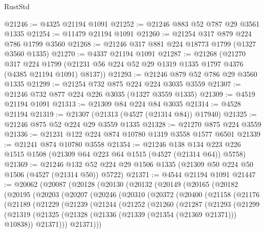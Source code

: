 \begin{lexlean}{RustStd}
\begin{coremodule}
@21246 := @4325 @21194 @1091
@21252 := @21246 @883 @52 @787 @29 @3561 @1335
@21254 := @11479 @21194 @1091
@21260 := @21254 @317 @879 @224 @786 @1799 @3560
@21268 := @21246 @317 @881 @224 @18773 @1799 (@1327 @3560 @1335)
@21270 := @4337 @21194 @1091
@21287 := @21268
    (@21270
      @317
      @224
      @1799
      (@21231 @56 @224 @52 @29 @1319 @1335 @1797 @4376 (@4385 @21194 @1091) @8137))
@21293 := @21246 @879 @52 @786 @29 @3560 @1335
@21299 := @21254 @732 @875 @224 @224 @3035 @3559
@21307 := @21246 @732 @877 @224 @226 @3035 (@1327 @3559 @1335)
@21309 := @4519 @21194 @1091
@21313 := @21309 @84 @224 @84 @3035
@21314 := @4528 @21194
@21319 := @21307 (@21313 (@4527 (@21314 @84)) @17940)
@21325 := @21246 @875 @52 @224 @29 @3559 @1335
@21328 := @21270 @875 @224 @3559
@21336 := @21231 @122 @224 @874 @10780 @1319 @3558 @1577 @6501
@21339 := @21241 @874 @10780 @3558
@21354 := @21246
    @138
    @134
    @223
    @226
    @1515
    @1508
    (@21309 @64 @223 @64 @1515 (@4527 (@21314 @64)) @5758)
@21369 := @21246
    @132
    @52
    @224
    @29
    @1506
    @1335
    (@21309 @50 @224 @50 @1506 (@4527 (@21314 @50)) @5722)
@21371 := @4544 @21194 @1091
@21447 := @20062
    (@20087
      (@20128
        (@20130
          (@20132
            (@20149
              (@20165
                (@20182
                  (@20195
                    (@20203
                      (@20207
                        (@20246
                          (@20310
                            (@20372
                              (@20400
                                (@21158
                                  (@21176
                                    (@21189
                                      (@21229
                                        (@21239
                                          (@21244
                                            (@21252
                                              (@21260
                                                (@21287
                                                  (@21293
                                                    (@21299
                                                      (@21319
                                                        (@21325
                                                          (@21328
                                                            (@21336
                                                              (@21339 (@21354 (@21369 @21371)))
                                                              @10838))
                                                          @21371)))
                                                    @21371)))

\end{coremodule}
\end{lexlean}
